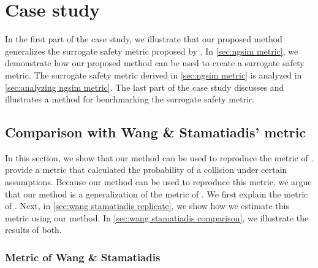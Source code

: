\section{Case study}
\label{sec:case study}

In the first part of the case study, we illustrate that our proposed method generalizes the surrogate safety metric proposed by \textcite{wang2014evaluation}.
In \cref{sec:ngsim metric}, we demonstrate how our proposed method can be used to create a surrogate safety metric.
The surrogate safety metric derived in \cref{sec:ngsim metric} is analyzed in \cref{sec:analyzing ngsim metric}.
The last part of the case study discusses and illustrates a method for benchmarking the surrogate safety metric.



\subsection{Comparison with Wang \& Stamatiadis' metric}
\label{sec:wang stamatiadis}

In this section, we show that our method can be used to reproduce the metric of \textcite{wang2014evaluation}.
\textcite{wang2014evaluation} provide a metric that calculated the probability of a collision under certain assumptions. 
Because our method can be used to reproduce this metric, we argue that our method is a generalization of the metric of \textcite{wang2014evaluation}.
We first explain the metric of \textcite{wang2014evaluation}. 
Next, in \cref{sec:wang stamatiadis replicate}, we show how we estimate this metric using our method.
In \cref{sec:wang stamatiadis comparison}, we illustrate the results of both.



\subsubsection{Metric of Wang \& Stamatiadis}
\label{sec:wang stamatiadis explanation}

